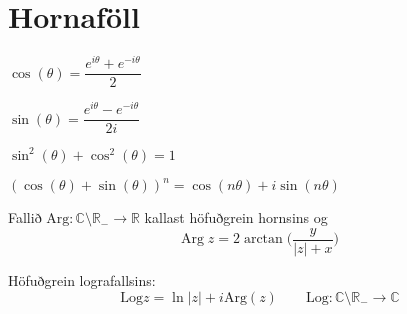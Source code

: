 \noindent
\section*{Hornaföll}

\begin{minipage}{.5\linewidth}
  $\cos(\theta) = \dfrac{e^{i \theta}+e^{-i\theta}}{2}$
\end{minipage}%
\begin{minipage}{.5\linewidth}
	$\sin(\theta) = \dfrac{e^{i \theta}-e^{-i\theta}}{2i}$
\end{minipage}

\vspace{8mm}

\begin{minipage}{.5\linewidth}
  $\sin^2(\theta) + \cos^2(\theta) =1$
\end{minipage}%
\begin{minipage}{.5\linewidth}
	$(\cos(\theta)+\sin(\theta))^n = \cos(n\theta)+i\sin(n\theta)$
\end{minipage}

\begin{minipage}{1\linewidth}
Fallið $\text{Arg} : \mathbb{C} \setminus \mathbb{R_{-}} \to \mathbb{R}$ kallast höfuðgrein hornsins og
\begin{equation*}
  \text{Arg} \; z = 2 \arctan \bigg(\frac{y}{|z| + x} \biggl)
\end{equation*}
\end{minipage}
%
\begin{minipage}{1\linewidth}
\noindent Höfuðgrein lografallsins:
\begin{equation*}
      \text{Log} z = \ln |z| + i \text{Arg}(z) \quad  \quad \text{Log}: \mathbb{C} \setminus \mathbb{R_{-}} \to \mathbb{C}
\end{equation*}
\end{minipage}
